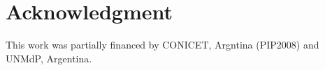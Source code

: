 \documentclass[a4paper]{elsart}
\begin{document}










\section*{Acknowledgment}
This work was partially financed by CONICET, Argntina (PIP2008) and UNMdP, Argentina.



\end{document}
